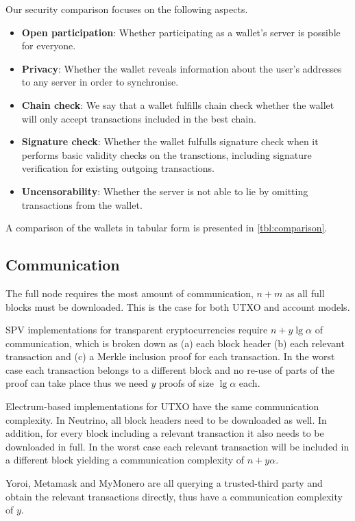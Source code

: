 Our security comparison focuses on the following aspects.
\begin{itemize}
    \item \textbf{Open participation}: Whether participating as a wallet's server is possible for everyone.
    \item \textbf{Privacy}: Whether the wallet reveals information about the user's addresses to any server in order to synchronise.
    \item \textbf{Chain check}: We say that a wallet fulfills chain check whether the wallet will only accept transactions included in the best chain.
    \item \textbf{Signature check}: Whether the wallet fulfulls signature check when it performs basic validity checks on the transctions, including signature verification for existing outgoing transactions.
    \item \textbf{Uncensorability}: Whether the server is not able to lie by omitting transactions from the wallet.
\end{itemize}

A comparison of the wallets in tabular form is presented in \cref{tbl:comparison}.

\subsection{Communication}
The full node requires the most amount of communication, $n+m$ as all full blocks must be downloaded. This is the case for both UTXO and account models.

SPV implementations for transparent cryptocurrencies require $n+y\lg{\alpha}$ of communication, which is broken down as (a) each block header (b) each relevant transaction and (c) a Merkle inclusion proof for each transaction. In the worst case each transaction belongs to a different block and no re-use of parts of the proof can take place thus we need $y$ proofs of size $\lg{\alpha}$ each.

Electrum-based implementations for UTXO have the same communication complexity. In Neutrino, all block headers need to be downloaded as well. In addition, for every block including a relevant transaction it also needs to be downloaded in full. In the worst case each relevant transaction will be included in a different block yielding a communication complexity of $n+y\alpha$.

Yoroi, Metamask and MyMonero are all querying a trusted-third party and obtain the relevant transactions directly, thus have a communication complexity of $y$.


